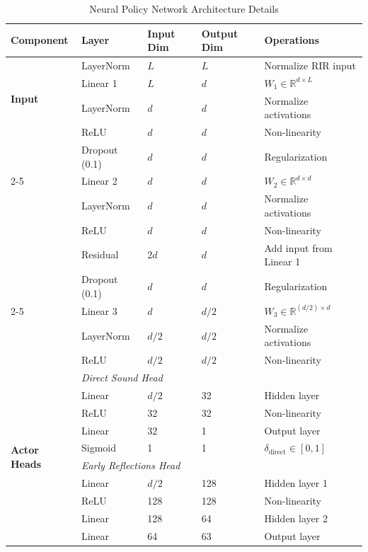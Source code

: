 \begin{table}[htbp]
\centering
\caption{Neural Policy Network Architecture Details}
\label{tab:network_architecture}
\small
\begin{tabular}{@{}llllp{4cm}@{}}
\toprule
\textbf{Component} & \textbf{Layer} & \textbf{Input Dim} & \textbf{Output Dim} & \textbf{Operations} \\
\midrule
\multirow{4}{*}{\textbf{Input}} 
& LayerNorm & $L$ & $L$ & Normalize RIR input \\
\cmidrule(lr){2-5}
\multirow{8}{*}{\textbf{Encoder}} 
& Linear 1 & $L$ & $d$ & $W_1 \in \mathbb{R}^{d \times L}$ \\
& LayerNorm & $d$ & $d$ & Normalize activations \\
& ReLU & $d$ & $d$ & Non-linearity \\
& Dropout (0.1) & $d$ & $d$ & Regularization \\
\cmidrule(lr){2-5}
& Linear 2 & $d$ & $d$ & $W_2 \in \mathbb{R}^{d \times d}$ \\
& LayerNorm & $d$ & $d$ & Normalize activations \\
& ReLU & $d$ & $d$ & Non-linearity \\
& Residual & $2d$ & $d$ & Add input from Linear 1 \\
& Dropout (0.1) & $d$ & $d$ & Regularization \\
\cmidrule(lr){2-5}
& Linear 3 & $d$ & $d/2$ & $W_3 \in \mathbb{R}^{(d/2) \times d}$ \\
& LayerNorm & $d/2$ & $d/2$ & Normalize activations \\
& ReLU & $d/2$ & $d/2$ & Non-linearity \\
\midrule
\multirow{12}{*}{\textbf{Actor Heads}} 
& \multicolumn{4}{l}{\textit{Direct Sound Head}} \\
& Linear & $d/2$ & 32 & Hidden layer \\
& ReLU & 32 & 32 & Non-linearity \\
& Linear & 32 & 1 & Output layer \\
& Sigmoid & 1 & 1 & $\delta_{\text{direct}} \in [0, 1]$ \\
\cmidrule(lr){2-5}
& \multicolumn{4}{l}{\textit{Early Reflections Head}} \\
& Linear & $d/2$ & 128 & Hidden layer 1 \\
& ReLU & 128 & 128 & Non-linearity \\
& Linear & 128 & 64 & Hidden layer 2 \\
& Linear & 64 & 63 & Output layer \\

\end{tabular}
\end{table}
